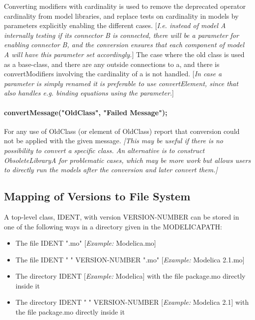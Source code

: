 \documentclass[10pt,a4paper]{report}
\def\doublelabel#1{\label{#1}}
\begin{document}
Converting modifiers with cardinality is used to remove the deprecated
operator cardinality from model libraries, and replace tests on
cardinality in models by parameters explicitly enabling the different
cases. {[}\emph{I.e. instead of model A internally testing if its
connector B is connected, there will be a parameter for enabling
connector B, and the conversion ensures that each component of model A
will have this parameter set accordingly.}{]} The case where the old
class is used as a base-class, and there are any outside connections to
a, and there is convertModifiers involving the cardinality of a is not
handled. {[}\emph{In case a parameter is simply renamed it is preferable
to use convertElement, since that also handles e.g. binding equations
using the parameter.}{]}

\paragraph*{convertMessage("OldClass", "Failed Message");}\doublelabel{convertmessageoldclass-failed-message}

For any use of OldClass (or element of OldClass) report that conversion
could not be applied with the given message. \emph{{[}This may be useful
if there is no possibility to convert a specific class. An alternative
is to construct ObsoleteLibraryA for problematic cases, which may be
more work but allows users to directly run the models after the
conversion and later convert them.{]}}

\subsection{Mapping of Versions to File System}\doublelabel{mapping-of-versions-to-file-system}

A top-level class, IDENT, with version VERSION-NUMBER can be stored in
one of the following ways in a directory given in the MODELICAPATH:

\begin{itemize}
\item
  The file IDENT ".mo" {[}\emph{Example:} Modelica.mo{]}
\item
  The file IDENT " " VERSION-NUMBER ".mo" {[}\emph{Example:} Modelica
  2.1.mo{]}
\item
  The directory IDENT {[}\emph{Example:} Modelica{]} with the file
  package.mo directly inside it
\item
  The directory IDENT " " VERSION-NUMBER {[}\emph{Example:} Modelica
  2.1{]} with the file package.mo directly inside it
\end{itemize}
\end{document}
